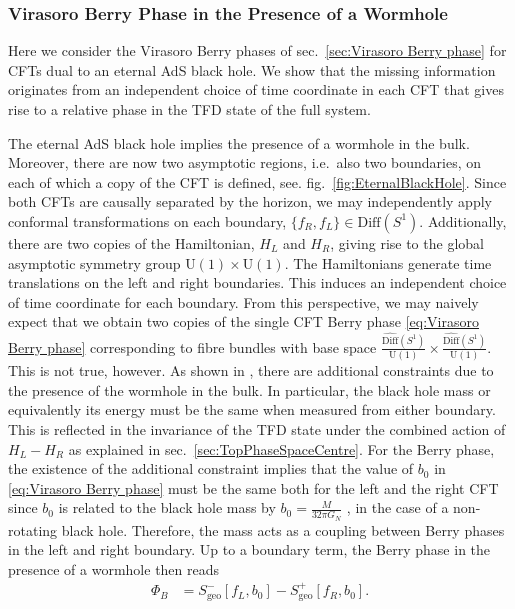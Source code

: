 \documentclass[a4paper,11pt]{article}
\newcommand{\U}{\text{U}}
\newcommand{\1}{\mathds{1}}
\begin{document}
\subsubsection{Virasoro Berry Phase in the Presence of a Wormhole}
\label{sec:Virasoro Berry phase in the presence of a wormhole}

Here we consider the Virasoro Berry phases of sec.~\ref{sec:Virasoro Berry phase} for CFTs dual to an eternal AdS black hole. We show that the missing information originates from an independent choice of time coordinate in each CFT that gives rise to a relative phase in the TFD state of the full system. 

The eternal AdS black hole implies the presence of a wormhole in the bulk. Moreover, there are now two asymptotic regions, i.e.~also two boundaries, on each of which a copy of the CFT is defined, see. fig.~\ref{fig:EternalBlackHole}. Since both CFTs are causally separated by the horizon, we may independently apply conformal transformations on each boundary, $\{f_R,f_L\}\in \text{Diff}(S^1)$. Additionally, there are two copies of the Hamiltonian, $H_L$ and $H_R$, giving rise to the global asymptotic symmetry group $\U(1)\times\U(1)$. The Hamiltonians generate time translations on the left and right boundaries. This induces an independent choice of time coordinate for each boundary. From this perspective, we may naively expect that we obtain two copies of the single CFT Berry phase \eqref{eq:Virasoro Berry phase} corresponding to fibre bundles with base space $\frac{\widehat{\text{Diff}}(S^1)}{\U(1)}\times \frac{\widehat{\text{Diff}}(S^1)}{\U(1)} $. This is not true, however. As shown in \cite{Henneaux:2019sjx,Banerjee:2022jnv}, there are additional constraints due to the presence of the wormhole in the bulk. In particular, the black hole mass or equivalently its energy must be the same when measured from either boundary. This is reflected in the invariance of the TFD state under the combined action of $H_L-H_R$ as explained in sec.~\ref{sec:TopPhaseSpaceCentre}. For the Berry phase, the existence of the additional constraint implies that the value of $b_0$ in \eqref{eq:Virasoro Berry phase} must be the same both for the left and the right CFT since $b_0$ is related to the black hole mass by $b_0=\frac{M}{32\pi G_N}$ \cite{Henneaux:2019sjx}, in the case of a non-rotating black hole. Therefore, the mass acts as a coupling between Berry phases in the left and right boundary. Up to a boundary term, the Berry phase in the presence of a wormhole then reads
\begin{align}
    \Phi_B&=S_{\text{geo}}^{-}\left[f_L,b_0\right]-S_{\text{geo}}^{+}\left[f_R,b_0\right].\label{eq:coupled_Berry_phase}
\end{align}
\end{document}
